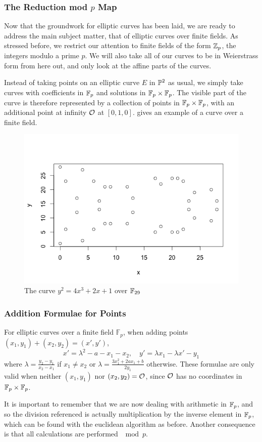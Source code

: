 \subsubsection{The Reduction mod $p$ Map}
Now that the groundwork for elliptic curves has been laid, we are ready to address the main subject matter, that of elliptic curves over finite fields.
As stressed before, we restrict our attention to finite fields of the form $\zn[p]$, the integers modulo a prime $p$.
We will also take all of our curves to be in Weierstrass form from here out, and only look at the affine parts of the curves.
%
% 
% 
% 
% 

Instead of taking points on an elliptic curve $E$ in $\pn[2]$ as usual, we simply take curves with coefficients in $\fp$ and solutions in $\fp \times \fp$.
The visible part of the curve is therefore represented by a collection of points in $\fp \times \fp$, with an additional point at infinity $\pai$ at $[0,1,0]$.
 gives an example of a curve over a finite field.
\begin{figure}[htbp]
	\centering
	\includegraphics[scale=0.5]{../Figures/finiteellipticcurve.png}
	\caption{The curve $y^2 = 4x^3 + 2x + 1$ over $\fp[29]$}
	\label{finitecurve}
\end{figure}
\subsubsection{Addition Formulae for Points}
For elliptic curves over a finite field $\mathbb{F}_p$, when adding points $(x_1,y_1) + (x_2,y_2) = (x',y')$,
$$x'=\lambda^2 - a - x_1 - x_2,\quad y' = \lambda x_1 -\lambda x' - y_1 $$
where $\lambda = \frac{y_2-y_1}{x_2-x_1}$ if $x_1\neq x_2$ or $\lambda=\frac{3x_1^2 + 2ax_1 + b}{2y_1}$ otherwise.
These formulae are only valid when neither $(x_1,y_1)$ nor $(x_2,y_2) = \pai$, since $\pai$ has no coordinates in $\fp \times \fp$.

It is important to remember that we are now dealing with arithmetic in $\fp$, and so the division referenced is actually multiplication by the inverse element in $\fp$, which can be found with the euclidean algorithm as before.
Another consequence is that all calculations are performed $\mod p$.
